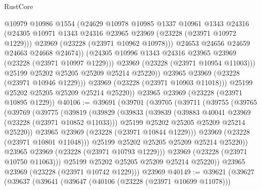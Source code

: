 \begin{lexlean}{RustCore}
\begin{coremodule}
                      @10979
                      @10986
                      @1554
                      (@24629
                        @10978
                        @10985
                        @1337
                        @10961
                        @1343
                        @24316
                        (@24305 @10971 @1343 @24316 @23965 @23969 (@23228 (@23971 @10972 @1229)))
                        @23969
                        (@23228 (@23971 @10962 @10978)))
                      @24653
                      @24656
                      @24659
                      @24663
                      @24668
                      @24674))
                  (@24305 @10996 @1343 @24316 @23965 @23969 (@23228 (@23971 @10997 @1229)))
                  @23969
                  (@23228 (@23971 @10954 @11003)))
                @25199
                @25202
                @25205
                @25209
                @25214
                @25220))
            @23965
            @23969
            (@23228 (@23971 @10946 @1229)))
          @23969
          (@23228 (@23971 @10903 @11018)))
        @25199
        @25202
        @25205
        @25209
        @25214
        @25220))
    @23965
    @23969
    (@23228 (@23971 @10895 @1229))
@40106 := @39691
    (@39701
      (@39705
        (@39711
          (@39755
            (@39765
              (@39769
                (@39775
                  (@39819
                    (@39829
                      (@39833
                        (@39839
                          (@39883 @40041 @23969 (@23228 (@23971 @10852 @11033)))
                          @25199
                          @25202
                          @25205
                          @25209
                          @25214
                          @25220))
                      @23965
                      @23969
                      (@23228 (@23971 @10844 @1229)))
                    @23969
                    (@23228 (@23971 @10801 @11048)))
                  @25199
                  @25202
                  @25205
                  @25209
                  @25214
                  @25220))
              @23965
              @23969
              (@23228 (@23971 @10793 @1229)))
            @23969
            (@23228 (@23971 @10750 @11063)))
          @25199
          @25202
          @25205
          @25209
          @25214
          @25220))
      @23965
      @23969
      (@23228 (@23971 @10742 @1229)))
    @23969
@40149 := @39621
    (@39627
      (@39637
        (@39641
          (@39647
            (@40106 (@23228 (@23971 @10699 @11078)))

\end{coremodule}
\end{lexlean}
